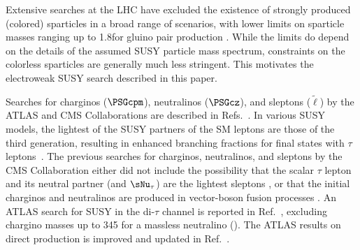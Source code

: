 Extensive searches at the LHC have excluded the existence of strongly produced (colored) sparticles in a broad range of scenarios,
with lower limits on sparticle masses ranging up to 1.8\TeV for gluino pair production
\cite{Chatrchyan:2013fea,Chatrchyan:2013mys,Chatrchyan:2014aea,Chatrchyan:2014lfa,Khachatryan:2015vra,Khachatryan:2015lwa,Aad:2015pfx,Aad:2015iea}.
While the limits do depend on the details of the assumed SUSY particle mass spectrum,
constraints on the colorless sparticles are generally much less stringent.
This motivates the electroweak SUSY search described in this paper.


Searches for charginos ($\PSGcpm$), neutralinos ($\PSGcz$), and sleptons ($\widetilde{\ell}$) by the ATLAS and CMS Collaborations are described in Refs.~\cite{Aad:2014nua,Aad:2014vma,Khachatryan:2014qwa,Khachatryan:2014mma,Khachatryan:2015kxa,Aad:2014yka,Aad:2015eda}.
In various SUSY models, the lightest of the SUSY partners of the SM leptons are those of the third generation,
resulting in enhanced branching fractions for final states with $\tau$ leptons~\cite{Martin:1997ns}.
The previous searches for charginos, neutralinos, and sleptons by the CMS Collaboration  either did not include the possibility that
the scalar $\tau$ lepton and its neutral partner (\PSGt and $\sNu_\tau$)
are the lightest sleptons \cite{Khachatryan:2014qwa}, or that the initial charginos and neutralinos are produced in vector-boson fusion processes \cite{Khachatryan:2015kxa}. An ATLAS search for SUSY in the di-$\tau$ channel is reported in Ref.~\cite{Aad:2014yka}, excluding chargino masses up to 345\GeV
for a massless neutralino (\PSGczDo).
The ATLAS results on direct \PSGt production is improved and updated in Ref.~\cite{Aad:2015eda}.

